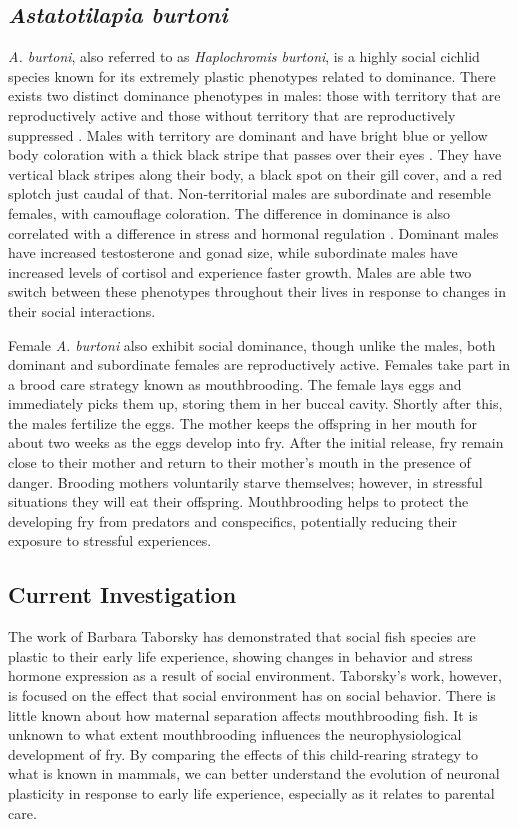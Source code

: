 \documentclass[12pt,twoside]{reedthesis}
\begin{document}
\subsection{\textit{Astatotilapia burtoni}}

 \textit{A. burtoni}, also referred to as \textit{Haplochromis burtoni}, is a
 highly social cichlid species known for its extremely plastic phenotypes related to
 dominance. There exists two distinct dominance phenotypes in males:
those with territory that are reproductively active and those without territory
that are reproductively suppressed \citep{fernald_quantitative_1977}. Males with
territory are dominant and have bright blue or yellow body coloration with a thick black
stripe that passes over their eyes \citep{border_color_2019}. They have vertical black stripes along their
body, a black spot on their gill cover, and a red splotch just caudal of that.
Non-territorial males are subordinate and resemble females, with camouflage coloration.
The difference in dominance is also correlated with a difference in stress and
hormonal regulation \citep{renn_fish_2008}. Dominant males have increased testosterone and gonad
size, while subordinate males have increased levels of
cortisol and experience faster growth. Males are
able two switch between these phenotypes throughout their lives in response to
changes in their social interactions.

Female \textit{A. burtoni} also exhibit social dominance, though unlike the
males, both dominant and subordinate females are reproductively active. Females take part in a brood care strategy known as mouthbrooding. The female lays eggs and immediately picks them up, storing them in
her buccal cavity. Shortly after this, the males fertilize the eggs. The
mother keeps the offspring in her mouth for about two weeks as the eggs
develop into fry. After the initial release, fry remain close to their mother
and return to their mother's mouth in the presence of danger. Brooding
mothers voluntarily starve themselves; however, in stressful situations they
will eat their offspring. Mouthbrooding helps to protect the developing fry from
predators and conspecifics, potentially reducing their exposure to stressful experiences.

\subsection{Current Investigation}
 
The work of Barbara Taborsky has demonstrated that social fish species are
plastic to their early life experience, showing changes in behavior and stress
hormone expression as a result of social environment. Taborsky's work, however, is focused on the effect that social
environment has on social behavior. There is little known about how maternal
separation affects mouthbrooding fish. It is unknown to what extent
mouthbrooding influences the neurophysiological development of fry. By comparing
the effects of this child-rearing strategy to what is known in mammals, we can
better understand the evolution of neuronal plasticity in response to early life
experience, especially as it relates to parental care. 
\end{document}
